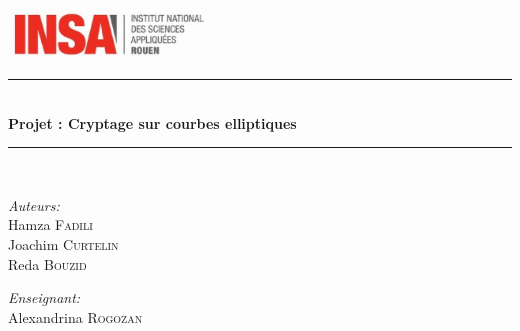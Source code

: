\documentclass[12pt]{article}
\newcommand{\HRule}{\rule{\linewidth}{0.5mm}}
\begin{document}
\begin{titlepage}
\begin{center}
\vspace{5mm}
\includegraphics[width=0.4\textwidth]{./insa.eps}\\[1.0 cm]

\HRule \\[0.4cm]
{ \huge \bfseries Projet : Cryptage sur courbes elliptiques }\\[0.4cm]

\HRule \\[1.5cm]

\begin{minipage}{0.4\textwidth}
\begin{flushleft} \large
\emph{Auteurs:}\\
Hamza \textsc{Fadili} \\
Joachim \textsc{Curtelin} \\
Reda \textsc{Bouzid} \\
\end{flushleft}
\end{minipage}
\begin{minipage}{0.4\textwidth}
\begin{flushright} \large
\emph{Enseignant:} \\
Alexandrina \textsc{Rogozan} \\
\end{flushright}
\end{minipage}

\vfill
\end{center}
\end{titlepage}


\tableofcontents





  
\end{document}
